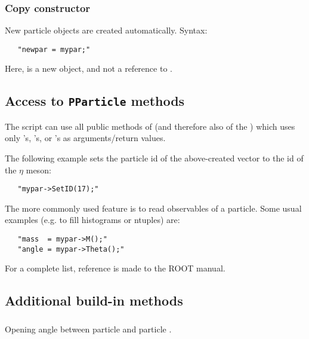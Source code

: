 {\subsubsection{Copy constructor}

New particle objects are created automatically. Syntax:

\begin{verbatim}
   "newpar = mypar;"
\end{verbatim}

Here,  is a new object, and not a reference to .

\subsection{Access to \texttt{PParticle} methods}\label{pparticle_methods}

The script can use all public methods of  (and
therefore also of the ) which uses only 's, 
's, or 's as arguments/return values.

The following example sets the particle id of the above-created vector
to the id of the $\eta$ meson:

\begin{verbatim}
   "mypar->SetID(17);"
\end{verbatim}

The more commonly used feature is to read observables of a particle. Some usual
examples (e.g. to fill histograms or ntuples) are:

\begin{verbatim}
   "mass  = mypar->M();"
   "angle = mypar->Theta();"
\end{verbatim}

For a complete list, reference is made to the ROOT manual.

\subsection{Additional build-in methods}


\subsubsection{}

Opening angle between  particle  and particle .

\subsubsection{}

}
